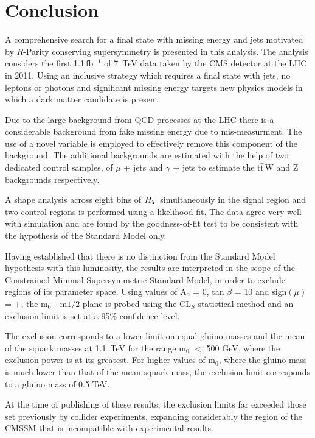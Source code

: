 \chapter{Conclusion}
\label{ch:conclusion}

A comprehensive search for a final state with missing energy and jets motivated by $R$-Parity conserving supersymmetry is presented in this analysis. The analysis considers the first 1.1\,fb$^{-1}$ of 7~TeV data taken by the CMS detector at the LHC in 2011. Using an inclusive strategy which requires a final state with jets, no leptons or photons and significant missing energy targets new physics models in which a dark matter candidate is present. 

Due to the large background from QCD processes at the LHC there is a considerable background from fake missing energy due to mis-measurment. The use of a novel variable \alt is employed to effectively remove this component of the background. The additional backgrounds are estimated with the help of two dedicated control samples, of $\mu$ + jets and $\gamma$ + jets to estimate the $\textrm{t}\bar{\textrm{t}}$W and Z backgrounds respectively.  


 A shape analysis across eight bins of $H_{T}$ simultaneously in the signal region and two control regions is performed using a likelihood fit. The data agree very well with simulation and are found by the goodness-of-fit test to be consistent with the hypothesis of the Standard Model only. 

Having established that there is no distinction from the Standard Model hypothesis with this luminosity, the results are interpreted in the scope of the Constrained Minimal Supersymmetric Standard Model, in order to exclude regions of its parameter space. Using values of A$_{0}$ = 0, tan $\beta$ = 10 and sign$(\mu)$ = +, the m$_{0}$ - m${1/2}$ plane is probed using the CL$_{S}$ statistical method and an exclusion limit is set at a 95\% confidence level. 

The exclusion corresponds to a lower limit on equal gluino masses and the mean of the squark  masses at 1.1~TeV for the range m$_{0}$ $<$ 500 GeV, where the exclusion power is at its greatest. For higher values of m$_{0}$, where the gluino mass is much lower than that of the mean squark mass, the exclusion limit corresponds to a gluino mass of 0.5 TeV. 

At the time of publishing of these results, the exclusion limits far exceeded those set previously by collider experiments, expanding considerably the region of the CMSSM that is incompatible with experimental results.  

